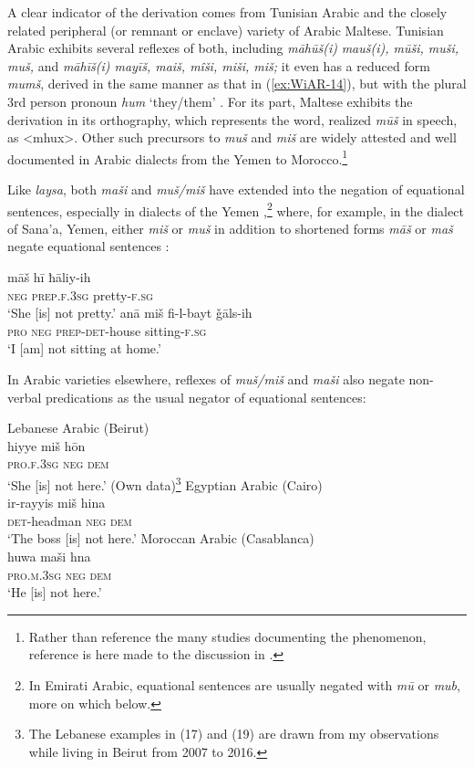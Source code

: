 \documentclass[output=paper,colorlinks,citecolor=brown]{langscibook}
\begin{document}
A clear indicator of the derivation comes from Tunisian Arabic and the closely related peripheral (or remnant or enclave) variety of Arabic Maltese. Tunisian Arabic exhibits several reflexes of both, including \textit{māhūš(i)} \textit{mauš(i), mūši, muši, muš,} and \textit{māhīš(i) mayīš, maiš, mîši, miši, miš;} it even has a reduced form \textit{mumš}, derived in the same manner as that in (\ref{ex:WiAR-14}), but with the plural 3rd person pronoun \textit{hum} ‘they/them’ \citep[718]{singer1984a}. For its part, Maltese exhibits the derivation in its orthography, which represents the word, realized \textit{mūš} in speech, as <mhux>. Other such precursors to \textit{muš} and \textit{miš} are widely attested and well documented in Arabic dialects from the Yemen to Morocco.\footnote{Rather than reference the many studies documenting the phenomenon, reference is here made to the discussion in \citet[100--101]{wilmsen2014a}.}

Like \textit{laysa}, both \textit{maši} and \textit{muš/miš} have extended into the negation of equational sentences, especially in dialects of the Yemen \citep[253, 258]{watson1993a},\footnote{In Emirati Arabic, equational sentences are usually negated with \textit{mū} or \textit{mub}, more on which below. } where, for example, in the dialect of Sana’a, Yemen, either \textit{miš} or \textit{muš} in addition to shortened forms \textit{māš} or \textit{maš} negate equational sentences \citep[253--256]{watson1993a}:

\ea \label{ex:WiAR-15}
  \ea
  	\gll māš hī ħāliy-ih\\
  	\textsc{neg} \textsc{prep.f.3sg} pretty-\textsc{f.sg}\\
  	\glt ‘She [is] not pretty.’ \citep[256]{watson1993a}
  \ex
  	\gll anā miš fi-l-bayt ǧāls-ih\\
  	\textsc{pro} \textsc{neg} \textsc{prep-det}-house sitting-\textsc{f.sg}\\
  	\glt ‘I [am] not sitting at home.’ \citep[258]{watson1993a}
\z \z

In Arabic varieties elsewhere, reflexes of \textit{muš/miš} and \textit{maši} also negate non-verbal predications as the usual negator of equational sentences:

\ea \label{ex:WiAR-16}
  \ea Lebanese Arabic (Beirut)\\
  	\gll hiyye miš hōn \\
  	\textsc{pro.f.3sg} \textsc{neg} \textsc{dem}\\
  	\glt ‘She [is] not here.’ (Own data)\footnote{The Lebanese examples in (17) and (19) are drawn from my observations while living in Beirut from 2007 to 2016.}
  \ex Egyptian Arabic (Cairo)\\
  	\gll ir-rayyis miš hina\\
  	\textsc{det}-headman \textsc{neg} \textsc{dem}\\
    \glt ‘The boss [is] not here.’ \citep[334]{woidich2006a}
  \ex Moroccan Arabic (Casablanca)\\
  	\gll huwa maši hna \\
  	\textsc{pro.m.3sg} \textsc{neg} \textsc{dem}\\
  	\glt ‘He [is] not here.’ \citep[155]{harrell2004a}
\z \z
\end{document}
